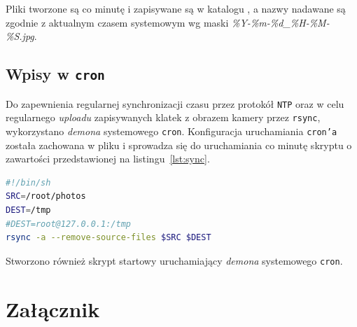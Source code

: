 \documentclass{article}
\begin{document}
Pliki tworzone są co minutę i zapisywane są w katalogu , a nazwy nadawane są zgodnie z aktualnym czasem systemowym wg maski \emph{\%Y-\%m-\%d\_\%H-\%M-\%S.jpg}.


\subsection{Wpisy w \texttt{cron}}

Do zapewnienia regularnej synchronizacji czasu przez protokół \texttt{NTP} oraz w celu regularnego \emph{uploadu} zapisywanych klatek z obrazem kamery przez \texttt{rsync}, wykorzystano \emph{demona} systemowego \texttt{cron}. Konfiguracja uruchamiania \texttt{cron'a} została zachowana w pliku  i sprowadza się do uruchamiania co minutę skryptu  o zawartości przedstawionej na listingu~\ref{lst:sync}.
\begin{lstlisting}[caption={Zawartość pliku \texttt{/root/sync.sh}},label=lst:sync,language=bash,frame=single,breaklines,captionpos=b]
#!/bin/sh
SRC=/root/photos
DEST=/tmp
#DEST=root@127.0.0.1:/tmp
rsync -a --remove-source-files $SRC $DEST
\end{lstlisting}
Stworzono również skrypt startowy  uruchamiający \emph{demona} systemowego \texttt{cron}.


\section{Załącznik}
\end{document}
